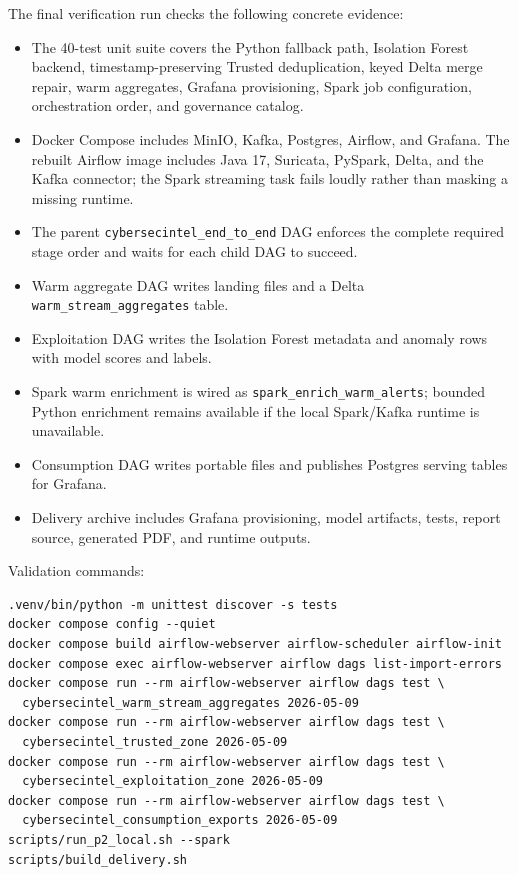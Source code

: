 \documentclass[11pt,a4paper]{article}
\newcommand{\code}[1]{\nolinkurl{#1}}
\begin{document}
The final verification run checks the following concrete evidence:
\begin{itemize}
  \item The 40-test unit suite covers the Python fallback path, Isolation Forest backend, timestamp-preserving Trusted deduplication, keyed Delta merge repair, warm aggregates, Grafana provisioning, Spark job configuration, orchestration order, and governance catalog.
  \item Docker Compose includes MinIO, Kafka, Postgres, Airflow, and Grafana. The rebuilt Airflow image includes Java 17, Suricata, PySpark, Delta, and the Kafka connector; the Spark streaming task fails loudly rather than masking a missing runtime.
  \item The parent \code{cybersecintel_end_to_end} DAG enforces the complete required stage order and waits for each child DAG to succeed.
  \item Warm aggregate DAG writes landing files and a Delta \code{warm_stream_aggregates} table.
  \item Exploitation DAG writes the Isolation Forest metadata and anomaly rows with model scores and labels.
  \item Spark warm enrichment is wired as \code{spark_enrich_warm_alerts}; bounded Python enrichment remains available if the local Spark/Kafka runtime is unavailable.
  \item Consumption DAG writes portable files and publishes Postgres serving tables for Grafana.
  \item Delivery archive includes Grafana provisioning, model artifacts, tests, report source, generated PDF, and runtime outputs.
\end{itemize}

Validation commands:
\begin{verbatim}
.venv/bin/python -m unittest discover -s tests
docker compose config --quiet
docker compose build airflow-webserver airflow-scheduler airflow-init
docker compose exec airflow-webserver airflow dags list-import-errors
docker compose run --rm airflow-webserver airflow dags test \
  cybersecintel_warm_stream_aggregates 2026-05-09
docker compose run --rm airflow-webserver airflow dags test \
  cybersecintel_trusted_zone 2026-05-09
docker compose run --rm airflow-webserver airflow dags test \
  cybersecintel_exploitation_zone 2026-05-09
docker compose run --rm airflow-webserver airflow dags test \
  cybersecintel_consumption_exports 2026-05-09
scripts/run_p2_local.sh --spark
scripts/build_delivery.sh
\end{verbatim}
\end{document}
